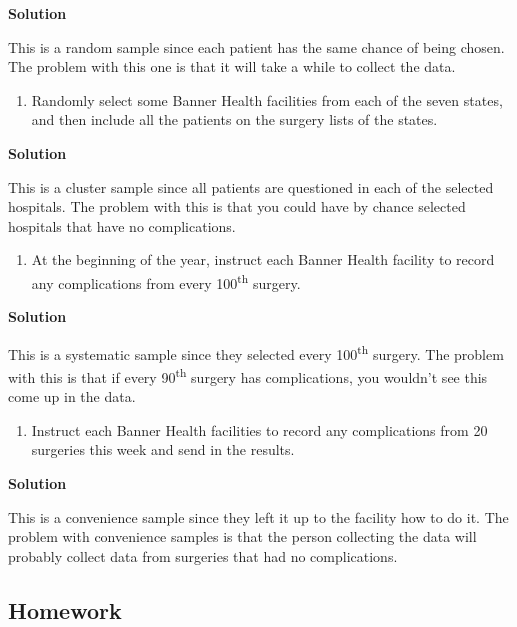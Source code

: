 \documentclass[]{book}
\providecommand{\tightlist}{%
  \setlength{\itemsep}{0pt}\setlength{\parskip}{0pt}}
\begin{document}
\textbf{Solution}

This is a random sample since each patient has the same chance of being chosen. The problem with this one is that it will take a while to collect the data.

\begin{enumerate}
\def\labelenumi{\alph{enumi}.}
\setcounter{enumi}{2}
\tightlist
\item
  Randomly select some Banner Health facilities from each of the seven states, and then include all the patients on the surgery lists of the states.
\end{enumerate}

\textbf{Solution}

This is a cluster sample since all patients are questioned in each of the selected hospitals. The problem with this is that you could have by chance selected hospitals that have no complications.

\begin{enumerate}
\def\labelenumi{\alph{enumi}.}
\setcounter{enumi}{3}
\tightlist
\item
  At the beginning of the year, instruct each Banner Health facility to record any complications from every 100\textsuperscript{th} surgery.
\end{enumerate}

\textbf{Solution}

This is a systematic sample since they selected every 100\textsuperscript{th} surgery. The problem with this is that if every 90\textsuperscript{th} surgery has complications, you wouldn't see this come up in the data.

\begin{enumerate}
\def\labelenumi{\alph{enumi}.}
\setcounter{enumi}{4}
\tightlist
\item
  Instruct each Banner Health facilities to record any complications from 20 surgeries this week and send in the results.
\end{enumerate}

\textbf{Solution}

This is a convenience sample since they left it up to the facility how to do it. The problem with convenience samples is that the person collecting the data will probably collect data from surgeries that had no complications.

\hypertarget{homework-1}{%
\subsection{Homework}\label{homework-1}}
\end{document}
